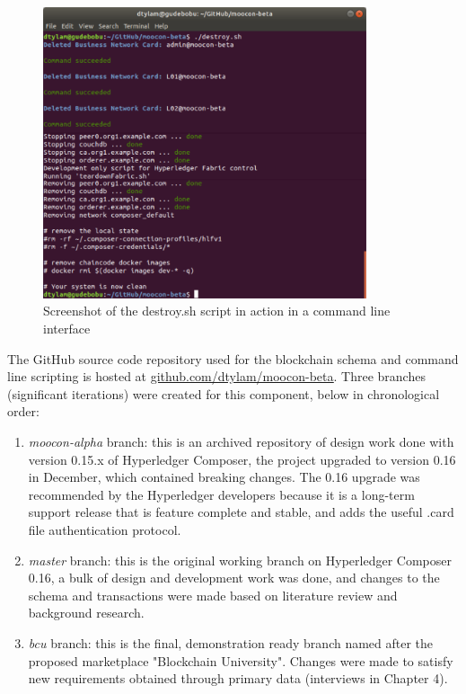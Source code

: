 \begin{enumerate}
\begin{figure}[!ht]
		      \includegraphics[width=0.85\textwidth]{destroysh}
		      \caption[Blockchain Teardown Script Screenshot]
		      {Screenshot of the destroy.sh script in action in a command line interface}
		      \label{fig:destroysh}
	      \end{figure}
\end{enumerate}

The GitHub source code repository used for the blockchain schema and command line scripting
is hosted at \href{https://github.com/dtylam/moocon-beta}{\underline{github.com/dtylam/moocon-beta}}.
Three branches (significant iterations) were created for this component, below in chronological order:
\begin{enumerate}
	\setlength\itemsep{0em}
	\item \textit{moocon-alpha} branch: this is an archived repository of design work done with version 0.15.x of
	      Hyperledger Composer, the project upgraded to version 0.16 in December, which contained breaking changes.
	      The 0.16 upgrade was recommended by the Hyperledger developers because it is a long-term support
	      release that is feature complete and stable, and adds the useful .card file authentication protocol.
	\item \textit{master} branch: this is the original working branch on Hyperledger Composer 0.16, a bulk of
	      design and development work was done, and changes to the schema and transactions were made based on
	      literature review and background research.
	\item \textit{bcu} branch: this is the final, demonstration ready branch named after the proposed marketplace
	      "Blockchain University". Changes were made to satisfy new requirements obtained through primary data (interviews in Chapter 4).
\end{enumerate}

